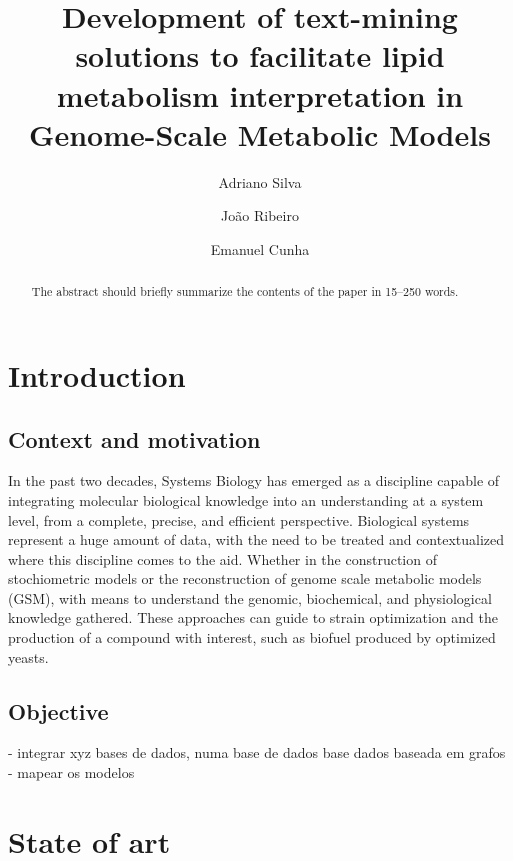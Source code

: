 \documentclass{llncs}
\begin{document}
\pagestyle{myheadings}
\title{Development of text-mining solutions to facilitate lipid metabolism interpretation in Genome-Scale Metabolic Models}

\author{Adriano Silva\and
João Ribeiro\and
Emanuel Cunha}

%
\maketitle              %
%
\begin{abstract}
The abstract should briefly summarize the contents of the paper in
15--250 words.

\end{abstract}
%
%
%
\section{Introduction}
\subsection{Context and motivation}
In the past two decades, Systems Biology has emerged as a discipline capable of integrating molecular biological knowledge into an understanding at a system level, from a complete, precise, and efficient perspective.
Biological systems represent a huge amount of data, with the need to be treated and contextualized where this discipline comes to the aid. 
Whether in the construction of stochiometric models or the reconstruction of genome scale metabolic models (GSM), with means to understand the genomic, biochemical, and physiological knowledge gathered\cite{Zou2018,Tavassoly2018}. 
These approaches can guide to strain optimization and the production of a compound with interest, such as biofuel produced by optimized yeasts\cite{Aung2013}.





\subsection{Objective}
- integrar xyz bases de dados, numa base de dados base dados baseada
em grafos
- mapear os modelos 
\section{State of art}
\end{document}
